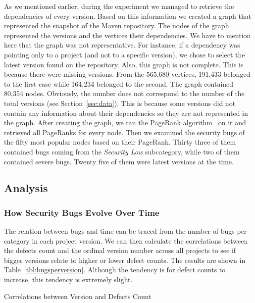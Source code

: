 \documentclass[conference]{llncs}
\begin{document}
As we mentioned earlier, during the experiment we managed to retrieve the
dependencies of every version. Based on this information we created a graph
that represented the snapshot of the Maven repository. The
nodes of the graph represented the versions and the vertices their dependencies.
We have to mention here that the graph was not representative. For instance, if
a dependency was pointing only to a project (and not to a specific version), we chose to
select the latest version found on the repository. Also, this graph is not
complete. This is because there were missing versions.
From the 565,680 vertices, 191,433
belonged to the first case while 164,234 belonged to the second.
The graph contained 80,354 nodes. Obviously, the number does not correspond to
the number of the total versions (see Section~\ref{sec:data}). This is because
some versions did not contain any information about their dependencies so they
are not represented in the graph. After creating the graph, we ran the PageRank
algorithm~\cite{BP98} on it and retrieved all PageRanks for every node. Then we
examined the security bugs of the fifty most popular nodes based on their PageRank.
Thirty three of them contained bugs coming from the {\it Security Low} subcategory,
while two of them contained severe bugs. Twenty five of them were latest
versions at the time.

\subsection{Analysis}
\label{sec:analysis}

\subsubsection{How Security Bugs Evolve Over Time}

The relation between bugs and time can be traced from the number of
bugs per category in each project version. We can then calculate the
correlations between the defects count and the ordinal version number
across all projects to see if bigger versions relate to higher or
lower defect counts. The results are shown in
Table~\ref{tbl:bugsperversion}. Although the tendency is for
defect counts to increase, this tendency is extremely slight.
\begin{table}
    \centering
    \caption{Correlations between Version and Defects Count}
    \label{tbl:bugsperversion}
    
\end{table}
\end{document}
